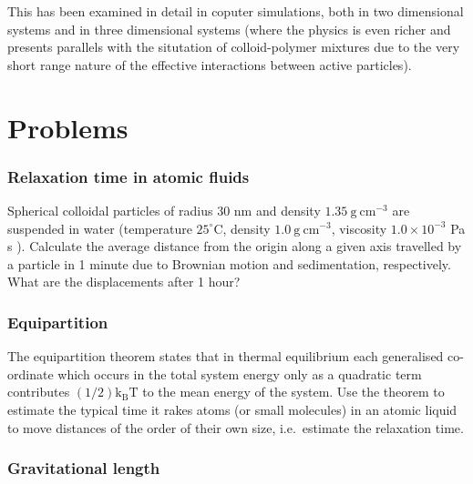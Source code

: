 \documentclass[
  letterpaper,
  enabledeprecatedfontcommands]{report}
\begin{document}
This has been examined in detail in coputer simulations, both in two
dimensional systems and in three dimensional systems (where the physics
is even richer and presents parallels with the situtation of
colloid-polymer mixtures due to the very short range nature of the
effective interactions between active particles).

\chapter{Problems}\label{problems}

\subsection{Relaxation time in atomic
fluids}\label{relaxation-time-in-atomic-fluids}

Spherical colloidal particles of radius 30 nm and density
\(1.35 \mathrm{~g} \mathrm{~cm}^{-3}\) are suspended in water
(temperature \(25^{\circ} \mathrm{C}\), density
\(1.0 \mathrm{~g} \mathrm{~cm}^{-3}\), viscosity \(1.0 \times 10^{-3}\)
Pa s ). Calculate the average distance from the origin along a given
axis travelled by a particle in 1 minute due to Brownian motion and
sedimentation, respectively. What are the displacements after 1 hour?

\subsection{Equipartition}\label{equipartition}

The equipartition theorem states that in thermal equilibrium each
generalised co-ordinate which occurs in the total system energy only as
a quadratic term contributes
\((1 / 2) \mathrm{k}_{\mathrm{B}} \mathrm{T}\) to the mean energy of the
system. Use the theorem to estimate the typical time it rakes atoms (or
small molecules) in an atomic liquid to move distances of the order of
their own size, i.e.~estimate the relaxation time.

\subsection{Gravitational length}\label{gravitational-length}
\end{document}
